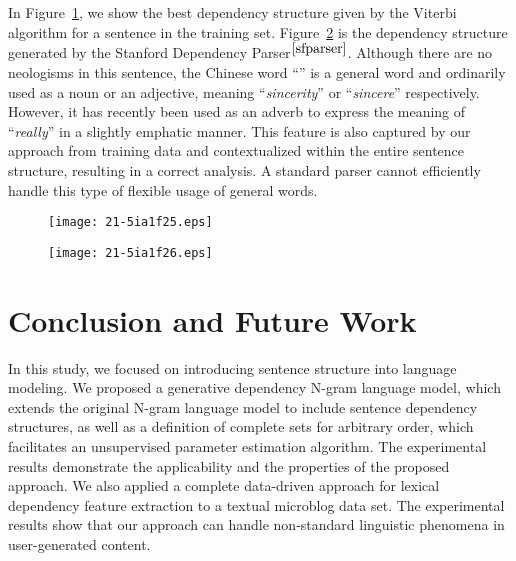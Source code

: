 \documentclass[english]{jnlp_1.4}
\begin{document}
In Figure~\ref{emsnt}, we show the best dependency structure given by the Viterbi algorithm for a sentence in the training set. Figure~\ref{sfsnt} is the dependency structure generated by the Stanford Dependency Parser$^{\ref{sfparser}}$. Although there are no neologisms in this sentence, the Chinese word \mbox{``''} is a general word and ordinarily used as a noun or an adjective, meaning ``{\em sincerity}'' or ``{\em sincere}'' respectively. However, it has recently been used as an adverb to express the meaning of ``{\em really}'' in a slightly emphatic manner. This feature is also captured by our approach from training data and contextualized within the entire sentence structure, resulting in a correct analysis. A standard parser cannot efficiently handle this type of flexible usage of general words.

\begin{figure}[t]
\centering
\texttt{[image: 21-5ia1f25.eps]}
\label{emsnt}
\end{figure}
\begin{figure}[t]
\centering
\texttt{[image: 21-5ia1f26.eps]}
\label{sfsnt}
\end{figure}


\section{Conclusion and Future Work}

In this study, 
we focused on introducing sentence structure into language modeling. We proposed a generative dependency N-gram language model, which extends the original N-gram language model to include sentence dependency structures, as well as 
a definition of complete sets for arbitrary order, which facilitates an unsupervised parameter estimation algorithm. 
The experimental results demonstrate the applicability and the properties of the proposed approach.
We also applied a complete data-driven approach for lexical dependency feature extraction to a textual  microblog data set. The experimental results show that our approach can handle non-standard linguistic phenomena in user-generated content. 
\end{document}
